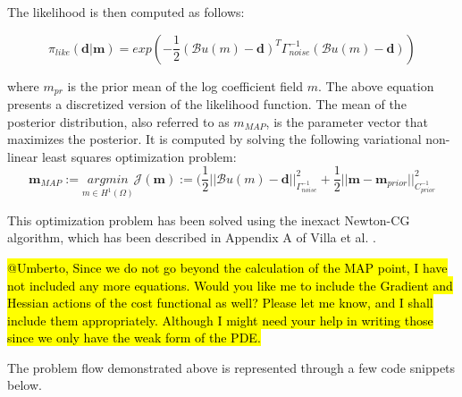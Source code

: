 The likelihood is then computed as follows:

\begin{equation}
    \pi_{like}(\textbf{d} | \textbf{m}) = exp(-\frac{1}{2}(\mathcal{B}u(m) -\textbf{d})^T\Gamma^{-1}_{noise}(\mathcal{B}u(m) -\textbf{d}))
\end{equation}

where $m_{pr}$ is the prior mean of the log coefficient field $m$. The above equation presents a discretized version of the likelihood function. The mean of the posterior distribution, also referred to as \textbf{${m_{MAP}} $}, is the parameter vector that maximizes the posterior. It is computed by solving the following variational non-linear least squares optimization problem:
\begin{equation}
    \textbf{m}_{MAP} := \underset{m \in H^1(\Omega)}{arg min}\mathcal{J}(\textbf{m}) := (\frac{1}{2} || \mathcal{B}u(m) - \textbf{d} ||^2_{\Gamma_{noise}^{-1}} + \frac{1}{2}|| \textbf{m} - \textbf{m}_{prior} || ^2_{C_{prior}^{-1}}
\end{equation}

This optimization problem has been solved using the inexact Newton-CG algorithm, which has been described in Appendix A of Villa et al. \cite{Villa_hIPPYlib_An_Extensible_2020}.

\hl{@Umberto, Since we do not go beyond the calculation of the MAP point, I have not included any more equations. Would you like me to include the Gradient and Hessian actions of the cost functional as well? Please let me know, and I shall include them appropriately. Although I might need your help in writing those since we only have the weak form of the PDE.}

The problem flow demonstrated above is represented through a few code snippets below.

